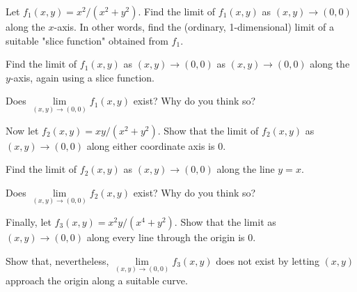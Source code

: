 \documentclass[12pt]{exam}
\theoremstyle{definition}
\begin{document}
\begin{questions}

\question Let $f_1(x,y) = x^2/(x^2 + y^2)$. Find the limit of $f_1(x,y)$ as $(x,y) \to (0,0)$ along the $x$-axis. In other words, find the (ordinary, 1-dimensional) limit of a suitable "slice function" obtained from $f_1$.


\question Find the limit of $f_1(x,y)$ as $(x,y) \to (0,0)$ as $(x,y) \to (0,0)$ along the $y$-axis, again using a slice function.


\question Does $\lim\limits_{(x,y) \to (0,0)} f_1 (x,y)$ exist? Why do you think so?


\newpage

\question Now let $f_2(x,y) = xy/(x^2 + y^2)$. Show that the limit of $f_2(x,y)$ as $(x,y) \to (0,0)$ along either coordinate axis is 0.


\question Find the limit of $f_2(x,y)$  as $(x,y) \to (0,0)$ along the line $y = x$.


\question Does $\lim\limits_{(x,y) \to (0,0)} f_2 (x,y)$ exist? Why do you think so?


\question Finally, let $f_3(x,y) = x^2 y/(x^4 + y^2)$. Show that the limit as $(x,y) \to (0,0)$ along every line through the origin is $0$.


\question Show that, nevertheless, $\lim\limits_{(x,y) \to (0,0)} f_3 (x,y)$ does not exist by letting $(x,y)$ approach the origin along a suitable curve.


\end{questions} 
\end{document}
